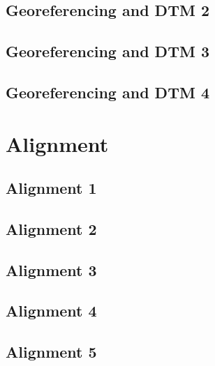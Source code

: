 \documentclass{scrartcl}
\begin{document}
\subsection{Georeferencing and DTM 2}
\label{sec:georef_tin_2}
\clearpage

\subsection{Georeferencing and DTM 3} %
\label{sec:georef_tin_3}
\clearpage

\subsection{Georeferencing and DTM 4} %
\label{sec:georef_tin_4}
\clearpage

\section{Alignment}

\subsection{Alignment 1}
\label{sec:align_1}
\clearpage

\subsection{Alignment 2}
\label{sec:align_2}
\clearpage

\subsection{Alignment 3}
\label{sec:align_3}
\clearpage

\subsection{Alignment 4}
\label{sec:align_4}
\clearpage

\subsection{Alignment 5}
\label{sec:align_5}
\clearpage
\end{document}
